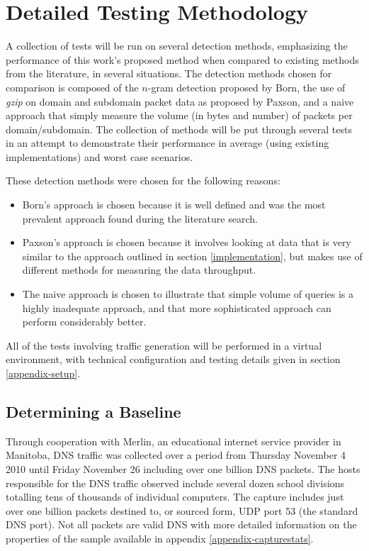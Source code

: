 \documentclass[12pt]{report}
\theoremstyle{remark}
\theoremstyle{definition}
\theoremstyle{definition}
\theoremstyle{definition}
\begin{document}
\section{Detailed Testing Methodology}
A collection of tests will be run on
several detection methods, emphasizing the performance of this work's proposed
method when compared to existing methods from the literature, in several
situations. The detection methods chosen for comparison is composed of the
$n$-gram detection proposed by Born\cite{Born2010.cfa}, the use of \emph{gzip}
on domain and subdomain packet data as proposed by Paxson\cite{Paxson2011}, and
a naive approach that simply measure the volume (in bytes and number) of packets
per domain/subdomain. The collection of methods will be put through several
tests in an attempt to demonstrate their performance in average (using existing
implementations) and worst case scenarios.

These detection methods were chosen for the following reasons:

\begin{itemize}
\item Born's approach is chosen because it is well defined and
was the most prevalent approach found during the literature search.

\item Paxson's approach is chosen because it involves looking at data that is very
similar to the approach outlined in section \ref{implementation}, but makes use
of different methods for measuring the data throughput.

\item The naive approach
is chosen to illustrate that simple volume of queries is a highly inadequate
approach, and that more sophisticated approach can perform considerably better.
\end{itemize}

All of the tests involving traffic generation will be performed in a virtual
environment, with technical configuration and testing details given in section
\ref{appendix-setup}.

\subsection{Determining a Baseline}
\label{baseline}
Through cooperation
with Merlin, an educational internet service provider in Manitoba, DNS traffic
was collected over a period from Thursday November 4 2010 until Friday November
26 including over one billion DNS packets. The hosts responsible for the DNS
traffic observed include several dozen school divisions totalling tens of
thousands of individual computers. The capture includes just over one billion
packets destined to, or sourced form, UDP port 53 (the standard DNS port). Not
all packets are valid DNS with more detailed information on the properties of
the sample available in appendix \ref{appendix-capturestats}.
\end{document}
